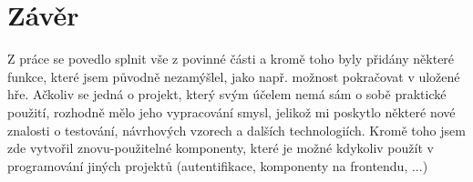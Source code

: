 \chapter*{Závěr}
Z práce se povedlo splnit vše z povinné části a kromě toho byly přidány některé funkce, které jsem původně nezamýšlel, jako např. možnost pokračovat v uložené hře. Ačkoliv se jedná o projekt, který svým účelem nemá sám o sobě praktické použití, rozhodně mělo jeho vypracování smysl, jelikož mi poskytlo některé nové znalosti o testování, návrhových vzorech a dalších technologiích. Kromě toho jsem zde vytvořil znovu-použitelné komponenty, které je možné kdykoliv použít v programování jiných projektů (autentifikace, komponenty na frontendu, ...)